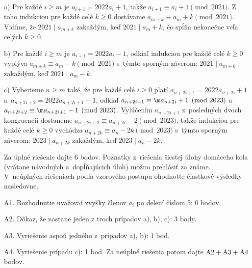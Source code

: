 {\item{a)} Pre každé $i\ge m$ je $a_{i+1}=2022a_i+1$, takže $a_{i+1}\equiv a_i+1\pmod{2021}$. Z toho indukciou pre každé celé $k\ge0$ dostávame $a_{m+k}\equiv a_m+k\pmod{2021}$. Vidíme, že $2021\mid a_{m+k}$ zakaždým, keď $2021\mid a_m+k$, čo spĺňa nekonečne veľa celých $k\ge0$.


\item{b)} Pre každé $i\ge m$ je $a_{i+1}=2022a_i-1$, odkiaľ indukciou pre každé celé $k\ge0$ vyplýva $a_{m+k}\equiv a_m-k \pmod{2021}$ s~týmto sporným záverom: $2021\mid a_{m+k}$ zakaždým, keď $2021\mid a_m-k$.


\item{c)} Vyberieme $n\ge m$ také, že pre každé celé $i\ge0$ platí $a_{n+2i+1}=2022a_{n+2i}+1$ a~$a_{n+2i+2}=2022a_{n+2i+1}-1$, odkiaľ $a_{n+2i+1}\equiv\m a_{n+2i}+1\pmod{2023}$ a $a_{n+2i+2}\equiv\m a_{n+2i+1}-1\pmod{2023}$. Vylúčením $a_{n+2i+1}$ z~posledných dvoch kongruencií dostaneme $a_{n+2i+2}\equiv a_{n+2i}-2\pmod{2023}$, takže indukciou pre každé celé $k\ge0$ vychádza $a_{n+2k}\equiv a_{n}-2k\pmod{2023}$ s~týmto sporným záverom: $2023\mid a_{n+2k}$ zakaždým, keď $2023\mid a_{n}-2k$.

\schemaABC
Za úplné riešenie dajte 6 bodov.
Poznatky z~riešenia šiestej úlohy domáceho kola (vrátane návodných a~dopĺňajúcich úloh) možno prehlásiť za známe.
V~neúplných riešeniach podľa vzorového postupu ohodnoťte
čiastkové výsledky nasledovne.
\item{A1.} Rozhodnutie uvažovať zvyšky členov $a_i$ po delení číslom 5: 0 bodov.
\item{A2.} Dôkaz, že nastane jeden z troch prípadov a), b), c): 3 body.
\item{A3.} Vyriešenie aspoň jedného z~prípadov a), b): 1 bod.
\item{A4.} Vyriešenie prípadu c): 1 bod.
\endgraf\noindent
Za neúplné riešenia potom dajte $\rm A2+A3+A4$ bodov.
\endschema
}

